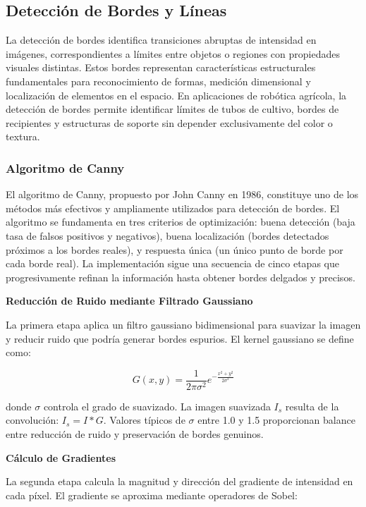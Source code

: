 \subsection{Detección de Bordes y Líneas}

La detección de bordes identifica transiciones abruptas de intensidad en imágenes, correspondientes a límites entre objetos o regiones con propiedades visuales distintas. Estos bordes representan características estructurales fundamentales para reconocimiento de formas, medición dimensional y localización de elementos en el espacio. En aplicaciones de robótica agrícola, la detección de bordes permite identificar límites de tubos de cultivo, bordes de recipientes y estructuras de soporte sin depender exclusivamente del color o textura.

\subsubsection{Algoritmo de Canny}

El algoritmo de Canny, propuesto por John Canny en 1986, constituye uno de los métodos más efectivos y ampliamente utilizados para detección de bordes. El algoritmo se fundamenta en tres criterios de optimización: buena detección (baja tasa de falsos positivos y negativos), buena localización (bordes detectados próximos a los bordes reales), y respuesta única (un único punto de borde por cada borde real). La implementación sigue una secuencia de cinco etapas que progresivamente refinan la información hasta obtener bordes delgados y precisos.

\textbf{Reducción de Ruido mediante Filtrado Gaussiano}

La primera etapa aplica un filtro gaussiano bidimensional para suavizar la imagen y reducir ruido que podría generar bordes espurios. El kernel gaussiano se define como:

\begin{equation}
G(x,y) = \frac{1}{2\pi\sigma^2} e^{-\frac{x^2 + y^2}{2\sigma^2}}
\end{equation}

donde $\sigma$ controla el grado de suavizado. La imagen suavizada $I_s$ resulta de la convolución: $I_s = I \ast G$. Valores típicos de $\sigma$ entre 1.0 y 1.5 proporcionan balance entre reducción de ruido y preservación de bordes genuinos.

\textbf{Cálculo de Gradientes}

La segunda etapa calcula la magnitud y dirección del gradiente de intensidad en cada píxel. El gradiente se aproxima mediante operadores de Sobel:

